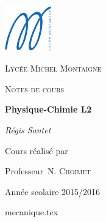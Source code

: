\documentclass[12pt]{book}
\theoremstyle{definition}
\theoremstyle{remark}
\begin{document}
\begin{titlepage}
    \centering
    \includegraphics[width=0.15\textwidth]{img/logo_lycee_michel_montaigne.png}\par\vspace{1cm}
    {\scshape Lycée Michel Montaigne \par}
    \vspace{1cm}
    {\scshape\Large Notes de cours\par}
    \vspace{1.5cm}
    {\huge\bfseries Physique-Chimie L2\par}
    \vspace{2cm}
    {\Large\itshape Régis Santet\par}
    \vfill
    Cours réalisé par\par
    Professeur~N. \textsc{Choimet}

    \vfill

    {\large Année scolaire 2015/2016\par}
\end{titlepage}

\dominitoc %
\tableofcontents

{mecanique.tex}

    
\end{document}
